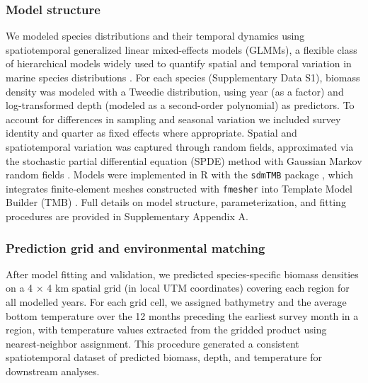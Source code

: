 \documentclass[9pt,twocolumn,twoside]{pnas-new}
\begin{document}
{\subsubsection*{Model structure} 
We modeled species distributions and their temporal dynamics using spatiotemporal generalized linear mixed-effects models (GLMMs), a flexible class of hierarchical models widely used to quantify spatial and temporal variation in marine species distributions \citep{thorson_geostatistical_2015, thorson_model-based_2016}. For each species (Supplementary Data S1), biomass density was modeled with a Tweedie distribution, using year (as a factor) and log-transformed depth (modeled as a second-order polynomial) as predictors. To account for differences in sampling and seasonal variation we included survey identity and quarter as fixed effects where appropriate. Spatial and spatiotemporal variation was captured through random fields, approximated via the stochastic partial differential equation (SPDE) method with Gaussian Markov random fields \citep{lindgren_explicit_2011}. Models were implemented in R with the \texttt{sdmTMB} package \citep{sdmTMB2025}, which integrates finite-element meshes constructed with \texttt{fmesher} \citep{lindgren_fmesher_2025} into Template Model Builder (TMB) \citep{kristensen_tmb_2016}. Full details on model structure, parameterization, and fitting procedures are provided in Supplementary Appendix A.

\subsubsection*{Prediction grid and environmental matching} 
After model fitting and validation, we predicted species-specific biomass densities on a 4 × 4 km spatial
grid (in local UTM coordinates) covering each region for all modelled years. For each grid cell, we assigned bathymetry and the average bottom temperature over the 12 months preceding the earliest survey month in a region, with temperature values extracted from the gridded product using nearest-neighbor assignment. This procedure generated a consistent spatiotemporal dataset of predicted biomass, depth, and temperature for downstream analyses.

}
\end{document}
